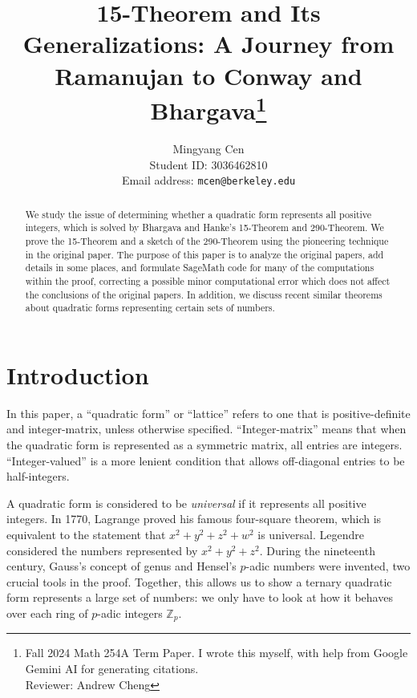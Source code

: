 \documentclass[letterpaper, 12pt]{article}
\title{15-Theorem and Its Generalizations: A Journey from Ramanujan to Conway and Bhargava\footnote{Fall 2024 Math 254A Term Paper. I wrote this myself, with help from Google Gemini AI for generating citations. \\ Reviewer: Andrew Cheng}}
\author{Mingyang Cen \\ Student ID: 3036462810 \\ Email address: \texttt{mcen@berkeley.edu}}
\begin{document}
\maketitle

\begin{abstract}
    We study the issue of determining whether a quadratic form represents all positive integers, which is solved by Bhargava and Hanke's 15-Theorem and 290-Theorem. We prove the 15-Theorem and a sketch of the 290-Theorem using the pioneering technique in the original paper. The purpose of this paper is to analyze the original papers, add details in some places, and formulate SageMath code for many of the computations within the proof, correcting a possible minor computational error which does not affect the conclusions of the original papers. In addition, we discuss recent similar theorems about quadratic forms representing certain sets of numbers.
\end{abstract}

\tableofcontents

\section{Introduction}
In this paper, a ``quadratic form'' or ``lattice'' refers to one that is positive-definite and integer-matrix, unless otherwise specified. ``Integer-matrix'' means that when the quadratic form is represented as a symmetric matrix, all entries are integers. ``Integer-valued'' is a more lenient condition that allows off-diagonal entries to be half-integers.

A quadratic form is considered to be \emph{universal} if it represents all positive integers.
%
In 1770, Lagrange \cite{LagrangeFourSquareTheorem} proved his famous four-square theorem, which is equivalent to the statement that $x^2 + y^2 + z^2 + w^2$ is universal. Legendre considered the numbers represented by $x^2 + y^2 + z^2$. During the nineteenth century, Gauss's concept of genus and Hensel's $p$-adic numbers were invented, two crucial tools in the proof. Together, this allows us to show a ternary quadratic form represents a large set of numbers: we only have to look at how it behaves over each ring of $p$-adic integers $\mathbb{Z}_p$.
\end{document}
